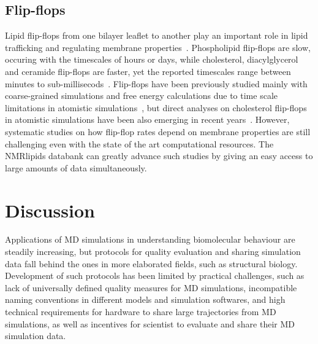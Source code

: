 \documentclass[fleqn,10pt]{wlscirep}
\begin{document}
\subsection{Flip-flops}
Lipid flip-flops from one bilayer leaflet to another play an important role in lipid trafficking and regulating membrane properties~\cite{vanmeer08}. Phospholipid flip-flops are slow, occuring with the timescales of hours or days, while cholesterol, diacylglycerol and ceramide flip-flops are faster, yet the reported timescales range between minutes to sub-millisecods~\cite{vanmeer08,steck12,parisio16,gu19}. Flip-flops have been previously studied mainly with coarse-grained simulations and free energy calculations due to time scale limitations in atomistic simulations~\cite{parisio16}, but direct analyses on cholesterol flip-flops in atomistic simulations have been also emerging in recent years~\cite{gu19,javanainen18,baral20}. However, systematic studies on how flip-flop rates depend on membrane properties are still challenging even with the state of the art computational resources. The NMRlipids databank can greatly advance such studies by giving an easy access to large amounts of data simultaneously.


\section{Discussion}


Applications of MD simulations in understanding biomolecular behaviour are steadily increasing, but protocols for quality evaluation and sharing simulation data fall behind the ones in more elaborated fields, such as structural biology. Development of such protocols has been limited by practical challenges, such as lack of universally defined quality measures for MD simulations, incompatible naming conventions in different models and simulation softwares, and high technical requirements for hardware to share large trajectories from MD simulations, as well as incentives for scientist to evaluate and share their MD simulation data. 
\end{document}
